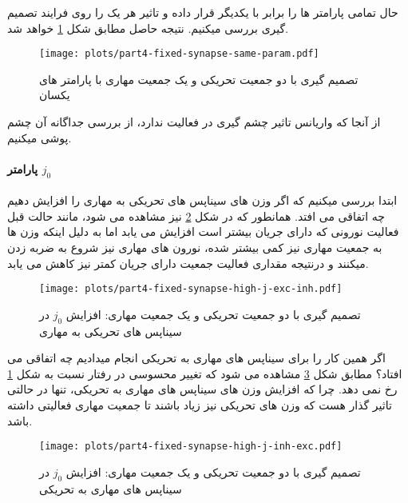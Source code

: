     حال تمامی پارامتر ها را برابر با یکدیگر قرار داده و تاثیر هر یک را روی فرایند تصمیم گیری بررسی میکنیم. نتیجه حاصل مطابق شکل 
    \ref{fig:part4-fixed-synapse-same-param} 
    خواهد شد.
    \begin{figure}[!ht]
        \centering
        \texttt{[image: plots/part4-fixed-synapse-same-param.pdf]} 
        \caption{تصمیم گیری با دو جمعیت تحریکی و یک جمعیت مهاری با پارامتر های یکسان}
        \label{fig:part4-fixed-synapse-same-param}
    \end{figure}

    از آنجا که واریانس تاثیر چشم گیری در فعالیت ندارد، از بررسی جداگانه آن چشم پوشی میکنیم.

    \paragraph*{پارامتر $j_0$}
    ابتدا بررسی میکنیم که اگر وزن های سیناپس های تحریکی به مهاری را افزایش دهیم چه اتفاقی می افتد. همانطور که در شکل 
    \ref{fig:part4-fixed-synapse-high-j-exc-inh}
    نیز مشاهده می شود، مانند حالت قبل فعالیت نورونی که دارای جریان بیشتر است افزایش می یابد اما به دلیل اینکه وزن ها به جمعیت مهاری نیز کمی بیشتر شده، نورون های مهاری نیز شروع به ضربه زدن میکنند و درنتیجه مقداری فعالیت جمعیت دارای جریان کمتر نیز کاهش می یابد.
    \begin{figure}[!ht]
        \centering
        \texttt{[image: plots/part4-fixed-synapse-high-j-exc-inh.pdf]} 
        \caption{تصمیم گیری با دو جمعیت تحریکی و یک جمعیت مهاری: افزایش $j_0$ در سیناپس های تحریکی به مهاری}
        \label{fig:part4-fixed-synapse-high-j-exc-inh}
    \end{figure}

    اگر همین کار را برای سیناپس های مهاری به تحریکی انجام میدادیم چه اتفاقی می افتاد؟ مطابق شکل
    \ref{fig:part4-fixed-synapse-high-j-inh-exc}
    مشاهده می شود که تغییر محسوسی در رفتار نسبت به شکل 
    \ref{fig:part4-fixed-synapse-same-param}
    رخ نمی دهد. چرا که افزایش وزن های سیناپس های مهاری به تحریکی، تنها در حالتی تاثیر گذار هست که وزن های تحریکی نیز زیاد باشند تا جمعیت مهاری فعالیتی داشته باشد.
    \begin{figure}[!ht]
        \centering
        \texttt{[image: plots/part4-fixed-synapse-high-j-inh-exc.pdf]} 
        \caption{تصمیم گیری با دو جمعیت تحریکی و یک جمعیت مهاری: افزایش $j_0$ در سیناپس های مهاری به تحریکی}
        \label{fig:part4-fixed-synapse-high-j-inh-exc}
    \end{figure}

